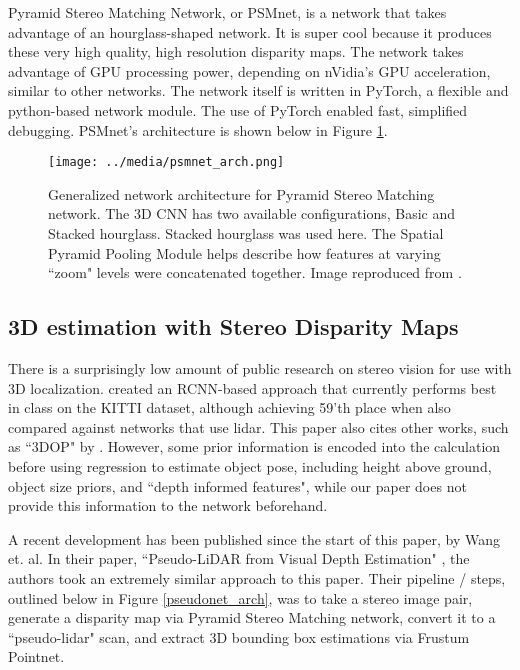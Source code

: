 Pyramid Stereo Matching Network, or PSMnet, is a network that takes advantage of an hourglass-shaped network. It is super cool because it produces these very high quality, high resolution disparity maps. The network takes advantage of GPU processing power, depending on nVidia's GPU acceleration, similar to other networks. The network itself is written in PyTorch, a flexible and python-based network module. The use of PyTorch enabled fast, simplified debugging. PSMnet's architecture is shown below in Figure \ref{psmnet_arch}. 


\begin{figure}[h]
    \texttt{[image: ../media/psmnet\_arch.png]}
    \caption{Generalized network architecture for Pyramid Stereo Matching network. The 3D CNN has two available configurations, Basic and Stacked hourglass. Stacked hourglass was used here. The Spatial Pyramid Pooling Module helps describe how features at varying ``zoom" levels were concatenated together. Image reproduced from \cite{chang_pyramid_2018}.}
    \label{psmnet_arch} 
\end{figure}

\subsection{3D estimation with Stereo Disparity Maps}
There is a surprisingly low amount of public research on stereo vision for use with 3D localization. \cite{li_stereo_2019} created an RCNN-based approach that currently performs best in class on the KITTI dataset, although achieving 59'th place when also compared against networks that use lidar. This paper also cites other works, such as ``3DOP" by \cite{chen_3d_2016}. However, some prior information is encoded into the calculation before using regression to estimate object pose, including height above ground, object size priors, and ``depth informed features", while our paper does not provide this information to the network beforehand.

A recent development has been published since the start of this paper, by Wang et. al. In their paper, ``Pseudo-LiDAR from Visual Depth Estimation" \cite{wang_pseudo-lidar_2019}, the authors took an extremely similar approach to this paper. Their pipeline / steps, outlined below in Figure \ref{pseudonet_arch}, was to take a stereo image pair, generate a disparity map via Pyramid Stereo Matching network, convert it to a ``pseudo-lidar" scan, and extract 3D bounding box estimations via Frustum Pointnet. \\

